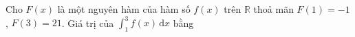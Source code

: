 \begin{ex}
Cho $F(x)$ là một nguyên hàm của hàm số $f(x)$ trên $\mathbb R$ thoả mãn $F(1)=-1$, $F(3)=21$. Giá trị của $\displaystyle\int_1^3f(x)\,\mathrm dx$ bằng
\end{ex}
